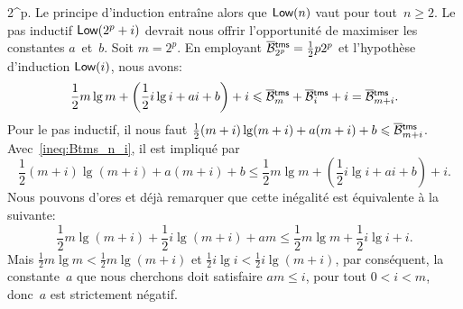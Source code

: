 2^p\). Le principe d'induction entraîne alors que \(\textsf{Low}({n})\)
vaut pour tout~\(n \geqslant 2\). Le pas inductif
\(\textsf{Low}({2^p+i})\) devrait nous offrir l'opportunité de maximiser
les constantes \(a\)~et~\(b\). Soit
\(m=2^p\). En employant \(\OB{\fun{tms}}{2^p} = \tfrac{1}{2}p2^p\) et
l'hypothèse d'induction \(\textsf{Low}({i})\), nous avons:
\begin{equation}
\frac{1}{2}m\lg m + \left(\frac{1}{2}i\lg i + ai + b\right) + i
\leqslant
\OB{\fun{tms}}{m} + \OB{\fun{tms}}{i} + i = \OB{\fun{tms}}{m+i}.
\label{ineq:Btms_n_i}
\end{equation}
Pour le pas inductif, il nous faut \(\tfrac{1}{2}(m+i)\lg(m+i) +
a(m+i) + b \leqslant
\OB{\fun{tms}}{m+i}\). Avec~\eqref{ineq:Btms_n_i}, il est impliqué
par
\begin{equation*}
\frac{1}{2}(m+i)\lg(m+i) + a(m+i) + b
\leqslant
\frac{1}{2}m\lg m + \left(\frac{1}{2}i\lg i + ai + b\right) + i.
\end{equation*}
Nous pouvons d'ores et déjà remarquer que cette inégalité est
équivalente à la suivante:
\begin{equation}
\frac{1}{2}m\lg(m+i) + \frac{1}{2}i\lg(m+i) + am
\leqslant \frac{1}{2}m\lg m + \frac{1}{2}i\lg i + i.
\label{ineq:Btms_n_i_details}
\end{equation}
Mais \(\tfrac{1}{2}m\lg m < \tfrac{1}{2}m\lg(m+i)\) et
\(\tfrac{1}{2}i\lg i < \tfrac{1}{2}i\lg(m+i)\), par conséquent, la
constante~\(a\) que nous cherchons doit satisfaire \(am \leqslant
i\), pour tout \(0 < i < m\), donc~\(a\) est strictement négatif.

